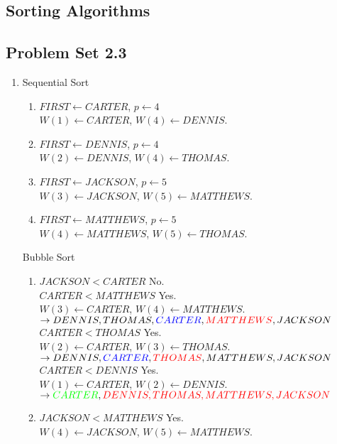 \subsection{Sorting Algorithms}
\subsection*{Problem Set 2.3}
\begin{enumerate}
	\item Sequential Sort
	\begin{enumerate}
		\item $FIRST \leftarrow CARTER$, $p \leftarrow 4$\\
			$W(1) \leftarrow CARTER$, $W(4) \leftarrow DENNIS$.
		\item $FIRST \leftarrow DENNIS$, $p \leftarrow 4$\\
			$W(2) \leftarrow DENNIS$, $W(4) \leftarrow THOMAS$.
		\item $FIRST \leftarrow JACKSON$, $p \leftarrow 5$\\
			$W(3) \leftarrow JACKSON$, $W(5) \leftarrow MATTHEWS$.
		\item $FIRST \leftarrow MATTHEWS$, $p \leftarrow 5$\\
			$W(4) \leftarrow MATTHEWS$, $W(5) \leftarrow THOMAS$.
	\end{enumerate}
	Bubble Sort
	\begin{enumerate}
		\item $JACKSON < CARTER$ No.\\ $CARTER < MATTHEWS$ Yes.\\ $W(3) \leftarrow CARTER$, $W(4)\leftarrow MATTHEWS$.\\ 
			$\to DENNIS,THOMAS,\textcolor{blue}{CARTER},\textcolor{red}{MATTHEWS},JACKSON$\\
			$CARTER < THOMAS$ Yes.\\ $W(2) \leftarrow CARTER$, $W(3) \leftarrow THOMAS$.\\ 
			$\to DENNIS,\textcolor{blue}{CARTER},\textcolor{red}{THOMAS},MATTHEWS,JACKSON$\\
			$CARTER < DENNIS$ Yes.\\ $W(1) \leftarrow CARTER$, $W(2) \leftarrow DENNIS$.\\
			$\to \textcolor{green}{CARTER},\textcolor{red}{DENNIS,THOMAS,MATTHEWS,JACKSON}$
		\item $JACKSON < MATTHEWS$ Yes.\\
			$W(4) \leftarrow JACKSON$, $W(5) \leftarrow MATTHEWS$.\\

\end{enumerate}
\end{enumerate}
